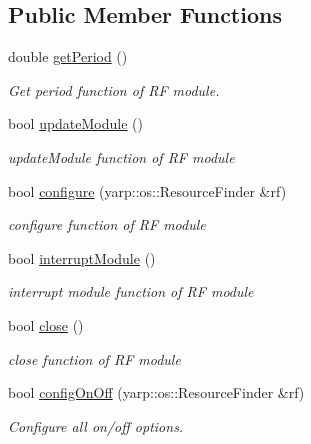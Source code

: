 \subsection*{Public Member Functions}
\begin{DoxyCompactItemize}
\item 
double \mbox{\hyperlink{classSuperqModule_aeec20285d89c1542d1b91c05c0f82539}{get\+Period}} ()
\begin{DoxyCompactList}\small\item\em Get period function of RF module. \end{DoxyCompactList}\item 
\mbox{\label{classSuperqModule_adba43b8815167f66e940bd80ab944af3}} 
bool \mbox{\hyperlink{classSuperqModule_adba43b8815167f66e940bd80ab944af3}{update\+Module}} ()
\begin{DoxyCompactList}\small\item\em update\+Module function of RF module \end{DoxyCompactList}\item 
\mbox{\label{classSuperqModule_a99527edc64196d4a9136416331fd5dd1}} 
bool \mbox{\hyperlink{classSuperqModule_a99527edc64196d4a9136416331fd5dd1}{configure}} (yarp\+::os\+::\+Resource\+Finder \&rf)
\begin{DoxyCompactList}\small\item\em configure function of RF module \end{DoxyCompactList}\item 
\mbox{\label{classSuperqModule_aca14ea8a02d8dbdef9a023da4c336891}} 
bool \mbox{\hyperlink{classSuperqModule_aca14ea8a02d8dbdef9a023da4c336891}{interrupt\+Module}} ()
\begin{DoxyCompactList}\small\item\em interrupt module function of RF module \end{DoxyCompactList}\item 
\mbox{\label{classSuperqModule_a6f88e21fe14a124919ffb07e26c04d15}} 
bool \mbox{\hyperlink{classSuperqModule_a6f88e21fe14a124919ffb07e26c04d15}{close}} ()
\begin{DoxyCompactList}\small\item\em close function of RF module \end{DoxyCompactList}\item 
\mbox{\label{classSuperqModule_a045733615dbe0c97f714dde4ea47a164}} 
bool \mbox{\hyperlink{classSuperqModule_a045733615dbe0c97f714dde4ea47a164}{config\+On\+Off}} (yarp\+::os\+::\+Resource\+Finder \&rf)
\begin{DoxyCompactList}\small\item\em Configure all on/off options. \end{DoxyCompactList}\item 

\end{DoxyCompactItemize}
